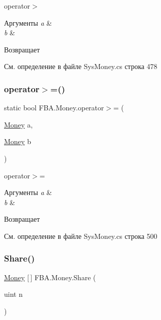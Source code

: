 operator$>$ 


\begin{DoxyParams}{Аргументы}
{\em a} & \\
\hline
{\em b} & \\
\hline
\end{DoxyParams}
\begin{DoxyReturn}{Возвращает}

\end{DoxyReturn}


См. определение в файле Sys\+Money.\+cs строка 478

\mbox{\label{struct_f_b_a_1_1_money_ac7fcecf827119127ff3c48f5c8b327e8}} 
\subsubsection{\texorpdfstring{operator$>$=()}{operator>=()}}
{\footnotesize\ttfamily static bool F\+B\+A.\+Money.\+operator$>$= (\begin{DoxyParamCaption}\item[{\mbox{\hyperlink{struct_f_b_a_1_1_money}{Money}}}]{a,  }\item[{\mbox{\hyperlink{struct_f_b_a_1_1_money}{Money}}}]{b }\end{DoxyParamCaption})\hspace{0.3cm}{\ttfamily [static]}}



operator$>$= 


\begin{DoxyParams}{Аргументы}
{\em a} & \\
\hline
{\em b} & \\
\hline
\end{DoxyParams}
\begin{DoxyReturn}{Возвращает}

\end{DoxyReturn}


См. определение в файле Sys\+Money.\+cs строка 500

\mbox{\label{struct_f_b_a_1_1_money_afa6894e26ab6c20cb7f0914d4187c96a}} 
\subsubsection{\texorpdfstring{Share()}{Share()}}
{\footnotesize\ttfamily \mbox{\hyperlink{struct_f_b_a_1_1_money}{Money}} \mbox{[}$\,$\mbox{]} F\+B\+A.\+Money.\+Share (\begin{DoxyParamCaption}\item[{uint}]{n }\end{DoxyParamCaption})}



